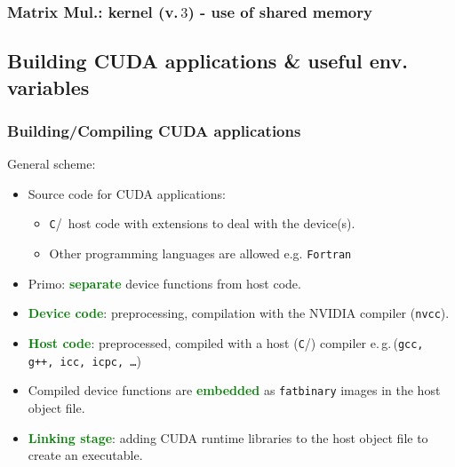 	
\begin{frame}
        \frametitle{Matrix Mul.: kernel (v.\,$3$) - use of shared memory}
        
\end{frame}


\subsection{Building CUDA applications \& useful env. variables} 
\begin{frame}
   \frametitle{Building/Compiling CUDA applications}
      General scheme:
      \begin{itemize}
         \item Source code for CUDA applications:
            \begin{itemize}		 
	       \item \texttt{C}/\CC\ host code with extensions to deal with the device(s). 
	       \item Other programming languages are allowed e.g. \texttt{Fortran} 
            \end{itemize}	
         \item Primo: \textbf{\textcolor{green}{separate}} device functions from host code.
         \item \textbf{\textcolor{green}{Device code}}: preprocessing, compilation 
	       with the NVIDIA compiler (\texttt{nvcc}).		 
         \item \textbf{\textcolor{green}{Host code}}: preprocessed, compiled with a host (\texttt{C}/\CC) 
	       compiler e.\,g.\,(\texttt{gcc, g++, icc, icpc, \ldots})
	 \item Compiled device functions are \textbf{\textcolor{green}{embedded}} as \texttt{fatbinary} 
	       images in the host object file.
         \item \textbf{\textcolor{green}{Linking stage}}: adding CUDA runtime libraries 
	       to the host object file to create an executable.
      \end{itemize}		      
\end{frame}


